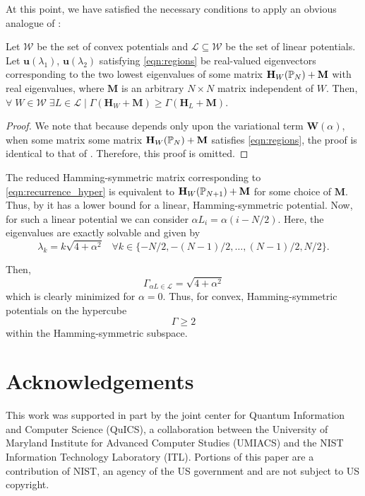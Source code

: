     At this point, we have satisfied the necessary conditions to apply an obvious analogue of :
    \begin{lem}\label{lem:lavine2}
	Let $\mathcal{W}$ be the set of convex potentials and $\mathcal{L}\subseteq{\mathcal{W}}$ be the set of linear potentials. Let $\mathbf{u}(\lambda_1)$, $\mathbf{u}(\lambda_2)$ satisfying \cref{eqn:regions} be real-valued eigenvectors corresponding to the two lowest eigenvalues of some matrix $\mathbf{H}_{W}(\mathbb{P}_{N}) + \mathbf{M}$ with real eigenvalues, where $\mathbf{M}$ is an arbitrary $N\times N$ matrix independent of $W$. Then, $\forall \;W\in\mathcal{W} \; \exists L \in \mathcal{L} \;\rvert\; \Gamma(\mathbf{H}_{W}+\mathbf{M}) \geq \Gamma(\mathbf{H}_{L}+\mathbf{M})$.
  \end{lem}
  \begin{proof}
  	We note that because  depends only upon the variational term $\mathbf{W}(\alpha)$, when some matrix some matrix $\mathbf{H}_{W}(\mathbb{P}_{N}) + \mathbf{M}$ satisfies \cref{eqn:regions}, the proof is identical to that of . Therefore, this proof is omitted.
  \end{proof}
   The reduced Hamming-symmetric matrix corresponding to \cref{eqn:recurrence_hyper} is equivalent to $\mathbf{H}_{W}(\mathbb{P}_{N+1}) + \mathbf{M}$ for some choice of $\mathbf{M}$. Thus, by  it has a lower bound for a linear, Hamming-symmetric potential.  Now, for such a linear potential we can consider $\alpha L_i = \alpha (i-N/2)$. Here, the eigenvalues are exactly solvable and given by
    \begin{equation}
    	\lambda_k = k\sqrt{4+\alpha^2} \;\;\; \text{$\forall k \in \{-N/2,-(N-1)/2,\dots,(N-1)/2,N/2\}$.}
    \end{equation}

    Then,
    \begin{equation}
    	\Gamma_{\alpha L \in \mathcal{L}} = \sqrt{4+\alpha^2}
    \end{equation}
    which is clearly minimized for $\alpha=0$. Thus, for convex, Hamming-symmetric potentials on the hypercube
    \begin{equation}
    	\Gamma \geq 2
    \end{equation}
    within the Hamming-symmetric subspace.

    \section{Acknowledgements}
    This work was supported in part by the joint center for Quantum Information and Computer Science (QuICS), a collaboration between the University of Maryland Institute for Advanced Computer Studies (UMIACS) and the NIST Information Technology Laboratory (ITL). Portions of this paper are a contribution of NIST, an agency of the US government and are not subject to US copyright.